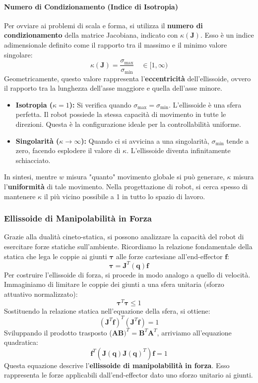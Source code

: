 ﻿\documentclass[11pt, a4paper]{article}
\begin{document}
\paragraph{Numero di Condizionamento (Indice di Isotropia)}
Per ovviare ai problemi di scala e forma, si utilizza il \textbf{numero di condizionamento} della matrice Jacobiana, indicato con $\kappa(\bm{J})$. Esso è un indice adimensionale definito come il rapporto tra il massimo e il minimo valore singolare:
\[
    \kappa(\bm{J}) = \frac{\sigma_{\text{max}}}{\sigma_{\text{min}}} \quad \in [1, \infty)
\]
Geometricamente, questo valore rappresenta l'\textbf{eccentricità} dell'ellissoide, ovvero il rapporto tra la lunghezza dell'asse maggiore e quella dell'asse minore.
\begin{itemize}
    \item \textbf{Isotropia ($\kappa = 1$):} Si verifica quando $\sigma_{\text{max}} = \sigma_{\text{min}}$. L'ellissoide è una sfera perfetta. Il robot possiede la stessa capacità di movimento in tutte le direzioni. Questa è la configurazione ideale per la controllabilità uniforme.
    \item \textbf{Singolarità ($\kappa \to \infty$):} Quando ci si avvicina a una singolarità, $\sigma_{\text{min}}$ tende a zero, facendo esplodere il valore di $\kappa$. L'ellissoide diventa infinitamente schiacciato.
\end{itemize}
In sintesi, mentre $w$ misura "quanto" movimento globale si può generare, $\kappa$ misura l'\textbf{uniformità} di tale movimento. Nella progettazione di robot, si cerca spesso di mantenere $\kappa$ il più vicino possibile a 1 in tutto lo spazio di lavoro.
\newpage
\subsubsection{Ellissoide di Manipolabilità in Forza}
Grazie alla dualità cineto-statica, si possono analizzare la capacità del robot di esercitare forze statiche sull'ambiente. Ricordiamo la relazione fondamentale della statica che lega le coppie ai giunti $\bm{\tau}$ alle forze cartesiane all'end-effector $\bm{f}$:
\[
    \bm{\tau} = \bm{J}^T(\bm{q}) \bm{f}
\]
Per costruire l'ellissoide di forza, si procede in modo analogo a quello di velocità. Immaginiamo di limitare le coppie dei giunti a una sfera unitaria (sforzo attuativo normalizzato):
\[
    \bm{\tau}^T\bm{\tau} \leq 1
\]
Sostituendo la relazione statica nell'equazione della sfera, si ottiene:
\[
    (\bm{J}^T\bm{f})^T (\bm{J}^T\bm{f}) = 1
\]
Sviluppando il prodotto trasposto ($\bm{A}\bm{B})^T = \bm{B}^T\bm{A}^T$, arriviamo all'equazione quadratica:
\begin{equation}
    \bm{f}^T \left( \bm{J}(\bm{q})\bm{J}(\bm{q})^T \right) \bm{f} = 1
\end{equation}
Questa equazione descrive l'\textbf{ellissoide di manipolabilità in forza}. Esso rappresenta le forze applicabili dall'end-effector dato uno sforzo unitario ai giunti.
\end{document}
